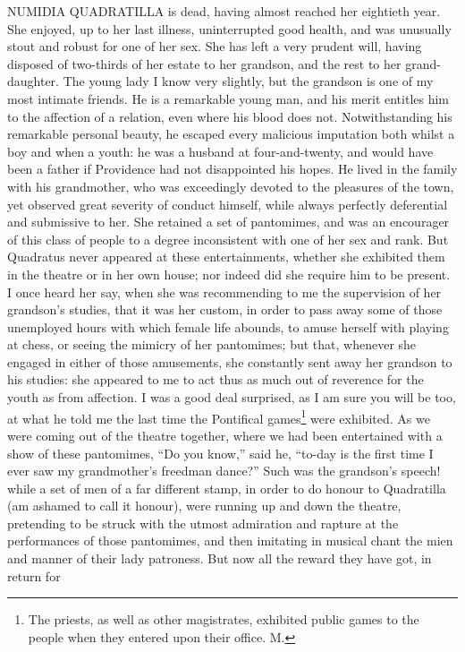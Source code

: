 NUMIDIA QUADRATILLA is dead, having almost reached her eightieth year. She
enjoyed, up to her last illness, uninterrupted good health, and was
unusually stout and robust for one of her sex. She has left a very prudent
will, having disposed of two-thirds of her estate to her grandson, and the
rest to her grand-daughter. The young lady I know very slightly, but the
grandson is one of my most intimate friends. He is a remarkable young man,
and his merit entitles him to the affection of a relation, even where his
blood does not. Notwithstanding his remarkable personal beauty, he escaped
every malicious imputation both whilst a boy and when a youth: he was a
husband at four-and-twenty, and would have been a father if Providence had
not disappointed his hopes. He lived in the family with his grandmother,
who was exceedingly devoted to the pleasures of the town, yet observed
great severity of conduct himself, while always perfectly deferential and
submissive to her. She retained a set of pantomimes, and was an encourager
of this class of people to a degree inconsistent with one of her sex and
rank. But Quadratus never appeared at these entertainments, whether she
exhibited them in the theatre or in her own house; nor indeed did she
require him to be present. I once heard her say, when she was recommending
to me the supervision of her grandson's studies, that it was her custom,
in order to pass away some of those unemployed hours with which female
life abounds, to amuse herself with playing at chess, or seeing the
mimicry of her pantomimes; but that, whenever she engaged in either of
those amusements, she constantly sent away her grandson to his studies:
she appeared to me to act thus as much out of reverence for the youth as
from affection. I was a good deal surprised, as I am sure you will be too,
at what he told me the last time the Pontifical games\footnote{The priests, as well as
other magistrates, exhibited public games to the people when they entered
upon their office. M.}
were exhibited. As we were coming out of the theatre together, where we
had been entertained with a show of these pantomimes, ``Do you know,'' said
he, ``to-day is the first time I ever saw my grandmother's freedman dance?''
Such was the grandson's speech! while a set of men of a far different
stamp, in order to do honour to Quadratilla (am ashamed to call it
honour), were running up and down the theatre, pretending to be struck
with the utmost admiration and rapture at the performances of those
pantomimes, and then imitating in musical chant the mien and manner of
their lady patroness. But now all the reward they have got, in return for

